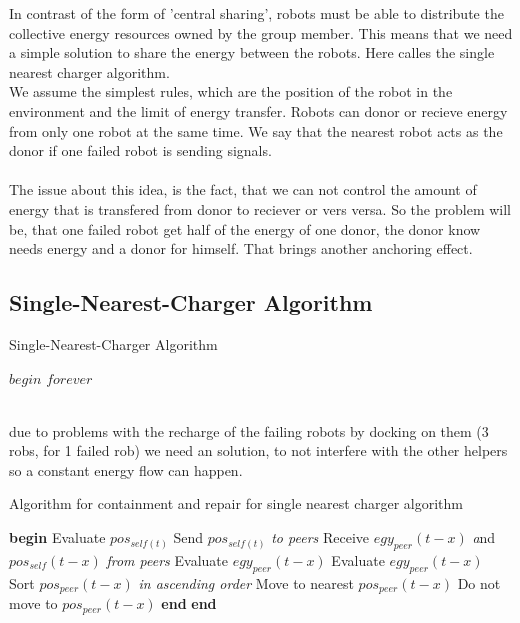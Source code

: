 \documentclass[
	a4paper,
	article,
	pagesize,
	pdftex,
	12pt,
	english,
	fleqn,
	final,
	]{scrartcl}
\begin{document}
In contrast of the form of 'central sharing', robots must be able to distribute the collective energy resources owned by the group member. This means that we need a simple solution to share the energy between the robots. Here calles the single nearest charger algorithm.
\\
We assume the simplest rules, which are the position of the robot in the environment and the limit of energy transfer. Robots can donor or recieve energy from only one robot at the same time. We say that the nearest robot acts as the donor if one failed robot is sending signals.
\\
\\
The issue about this idea, is the fact, that we can not control the amount of energy that is transfered from donor to reciever or vers versa. So the problem will be, that one failed robot get half of the energy of one donor, the donor know needs energy and a donor for himself. That brings another anchoring effect.
\clearpage


\subsection{Single-Nearest-Charger Algorithm}
\begin{algorithm}
\caption{Single-Nearest-Charger Algorithm}\label{SingleCharger}
\begin{algorithmic}[1]
	\State $begin$
	\Repeat 
	\Until $forever$
	\EndProcedure
\end{algorithmic}
\end{algorithm}
\\
due to problems with the recharge of the failing robots by docking on them (3 robs, 
for 1 failed rob) we need an solution, to not interfere with the other helpers
so a constant energy flow can happen.
\\
\begin{algorithm}
	\caption{Algorithm for containment and repair for single nearest charger
		algorithm}\label{SingleCharger}
	\begin{algorithmic}[1]
		\Procedure{}{}
		\State \textbf{begin}
		\State Evaluate $pos_{self(t)}$
		\State Send $pos_{self(t)}$ \textit {to peers}
		\State Receive $egy_{peer}(t-x)$ \textit and $pos_{self}(t-x)$ \textit {from peers}
		\State Evaluate $egy_{peer}(t-x)$
		\State Evaluate $egy_{peer}(t-x)$
		\State Sort $pos_{peer}(t-x)$ \textit {in ascending order}
		\State Move to nearest $pos_{peer}(t-x)$
		\Else
		\State Do not move to $pos_{peer}(t-x)$
		\EndIf \textbf{end}
		\EndFor \textbf{end}
		\EndProcedure
	\end{algorithmic}
\end{algorithm}
\\
\clearpage
\end{document}

